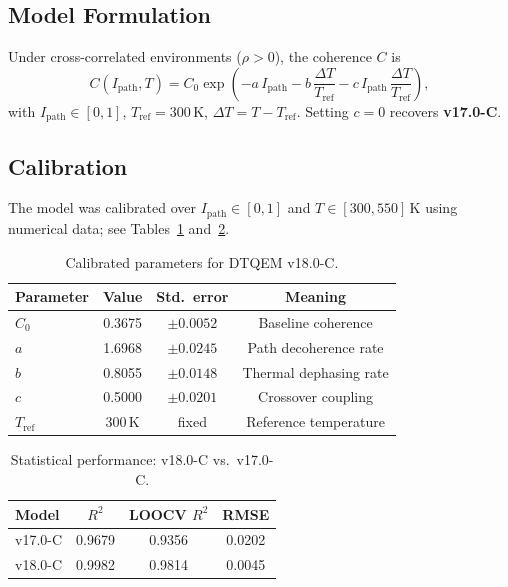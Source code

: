 \documentclass[reprint,amsmath,amssymb,aps,pra,superscriptaddress]{revtex4-2}
\begin{document}
\subsection{Model Formulation}
Under cross-correlated environments ($\rho>0$), the coherence $C$ is
\begin{equation}
C(I_{\text{path}},T)=C_0\exp\!\left(
-a\,I_{\text{path}}-b\,\frac{\Delta T}{T_{\text{ref}}}
-c\,I_{\text{path}}\,\frac{\Delta T}{T_{\text{ref}}}\right),
\label{eq:v18}
\end{equation}
with $I_{\text{path}}\in[0,1]$, $T_{\text{ref}}=300\,\mathrm{K}$,
$\Delta T=T-T_{\text{ref}}$. Setting $c=0$ recovers \textbf{v17.0-C}.

\subsection{Calibration}
The model was calibrated over $I_{\text{path}}\in[0,1]$ and
$T\in[300,550]\,\mathrm{K}$ using numerical data; see Tables~\ref{tab:parameters}
and~\ref{tab:performance}.

\begin{table}[h]
\caption{Calibrated parameters for DTQEM v18.0-C.}
\label{tab:parameters}
\begin{ruledtabular}
\begin{tabular}{lccc}
Parameter & Value & Std.\ error & Meaning\\\hline
$C_0$ & 0.3675 & $\pm0.0052$ & Baseline coherence\\
$a$ & 1.6968 & $\pm0.0245$ & Path decoherence rate\\
$b$ & 0.8055 & $\pm0.0148$ & Thermal dephasing rate\\
$c$ & 0.5000 & $\pm0.0201$ & Crossover coupling\\
$T_{\text{ref}}$ & 300\,K & fixed & Reference temperature\\
\end{tabular}
\end{ruledtabular}
\end{table}

\begin{table}[h]
\caption{Statistical performance: v18.0-C vs.\ v17.0-C.}
\label{tab:performance}
\begin{ruledtabular}
\begin{tabular}{lccc}
Model & $R^2$ & LOOCV $R^2$ & RMSE\\\hline
v17.0-C & 0.9679 & 0.9356 & 0.0202\\
v18.0-C & 0.9982 & 0.9814 & 0.0045\\
\end{tabular}
\end{ruledtabular}
\end{table}
\end{document}
